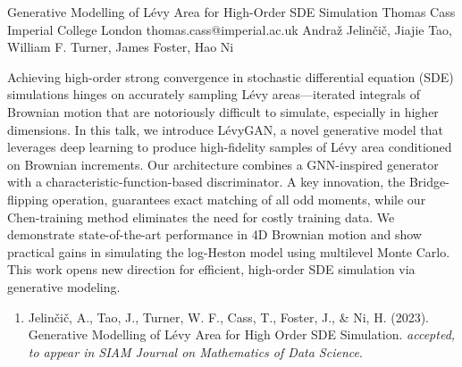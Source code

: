 \begin{talk}
  {Generative Modelling of L\'evy Area for High-Order SDE Simulation}%
  {Thomas Cass}%
  {Imperial College London}%
  {thomas.cass@imperial.ac.uk}%
  {Andra\v{z} Jelin\v{c}i\v{c},  Jiajie Tao, William F. Turner, James Foster, Hao Ni}%
  
    
Achieving high-order strong convergence in stochastic differential equation (SDE) simulations hinges on accurately sampling L\'evy areas—iterated integrals of Brownian motion that are notoriously difficult to simulate, especially in higher dimensions. In this talk, we introduce L\'evyGAN, a novel generative model that leverages deep learning to produce high-fidelity samples of L\'evy area conditioned on Brownian increments. Our architecture combines a GNN-inspired generator with a characteristic-function-based discriminator. A key innovation, the Bridge-flipping operation, guarantees exact matching of all odd moments, while our Chen-training method eliminates the need for costly training data. We demonstrate state-of-the-art performance in 4D Brownian motion and show practical gains in simulating the log-Heston model using multilevel Monte Carlo. This work opens new direction for efficient, high-order SDE simulation via generative modeling.


\medskip

\begin{enumerate}
 \item[{[1]}] Jelin\v{c}i\v{c}, A., Tao, J., Turner, W. F., Cass, T., Foster, J., \& Ni, H. (2023). Generative Modelling of L\'evy Area for High Order SDE Simulation. \textit{accepted, to appear in SIAM Journal on Mathematics of Data Science}.
\end{enumerate}
\end{talk}
